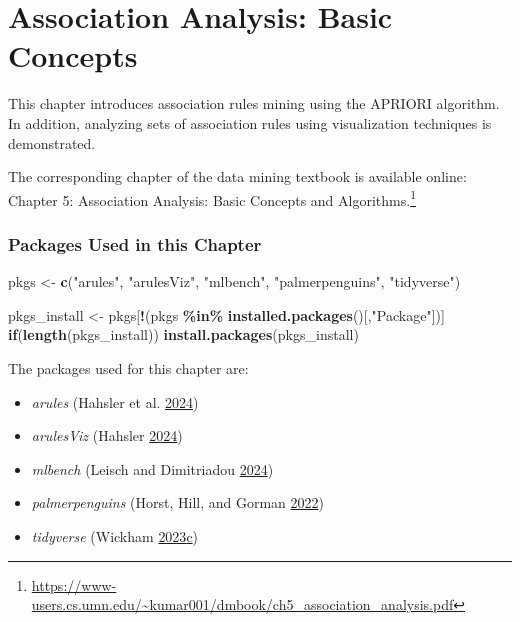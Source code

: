 \documentclass[
  notitlepage]{book}
\newenvironment{Shaded}{\begin{snugshade}}{\end{snugshade}}
\newcommand{\ControlFlowTok}[1]{\textcolor[rgb]{0.13,0.29,0.53}{\textbf{#1}}}
\newcommand{\KeywordTok}[1]{\textcolor[rgb]{0.13,0.29,0.53}{\textbf{#1}}}
\newcommand{\NormalTok}[1]{#1}
\newcommand{\OperatorTok}[1]{\textcolor[rgb]{0.81,0.36,0.00}{\textbf{#1}}}
\newcommand{\StringTok}[1]{\textcolor[rgb]{0.31,0.60,0.02}{#1}}
\DeclareRobustCommand{\href}[2]{#2\footnote{\url{#1}}}
\providecommand{\tightlist}{%
  \setlength{\itemsep}{0pt}\setlength{\parskip}{0pt}}
\begin{document}
\hypertarget{association-analysis-basic-concepts}{%
\chapter{Association Analysis: Basic Concepts}\label{association-analysis-basic-concepts}}

This chapter introduces association rules mining using the APRIORI
algorithm. In addition, analyzing sets of association rules
using visualization techniques is demonstrated.

The corresponding chapter of
the data mining textbook is available online:
\href{https://www-users.cs.umn.edu/~kumar001/dmbook/ch5_association_analysis.pdf}{Chapter 5: Association Analysis: Basic Concepts and Algorithms.}

\hypertarget{packages-used-in-this-chapter-3}{%
\subsection*{Packages Used in this Chapter}\label{packages-used-in-this-chapter-3}}

\begin{Shaded}
\begin{Highlighting}[]
\NormalTok{pkgs \textless{}{-}}\StringTok{ }\KeywordTok{c}\NormalTok{(}\StringTok{"arules"}\NormalTok{, }\StringTok{"arulesViz"}\NormalTok{, }\StringTok{"mlbench"}\NormalTok{, }
          \StringTok{"palmerpenguins"}\NormalTok{, }\StringTok{"tidyverse"}\NormalTok{)}

\NormalTok{pkgs\_install \textless{}{-}}\StringTok{ }\NormalTok{pkgs[}\OperatorTok{!}\NormalTok{(pkgs }\OperatorTok{\%in\%}\StringTok{ }\KeywordTok{installed.packages}\NormalTok{()[,}\StringTok{"Package"}\NormalTok{])]}
\ControlFlowTok{if}\NormalTok{(}\KeywordTok{length}\NormalTok{(pkgs\_install)) }\KeywordTok{install.packages}\NormalTok{(pkgs\_install)}
\end{Highlighting}
\end{Shaded}

The packages used for this chapter are:

\begin{itemize}
\tightlist
\item
  \emph{arules} (Hahsler et al. \protect\hyperlink{ref-R-arules}{2024})
\item
  \emph{arulesViz} (Hahsler \protect\hyperlink{ref-R-arulesViz}{2024})
\item
  \emph{mlbench} (Leisch and Dimitriadou \protect\hyperlink{ref-R-mlbench}{2024})
\item
  \emph{palmerpenguins} (Horst, Hill, and Gorman \protect\hyperlink{ref-R-palmerpenguins}{2022})
\item
  \emph{tidyverse} (Wickham \protect\hyperlink{ref-R-tidyverse}{2023}\protect\hyperlink{ref-R-tidyverse}{c})
\end{itemize}
\end{document}
